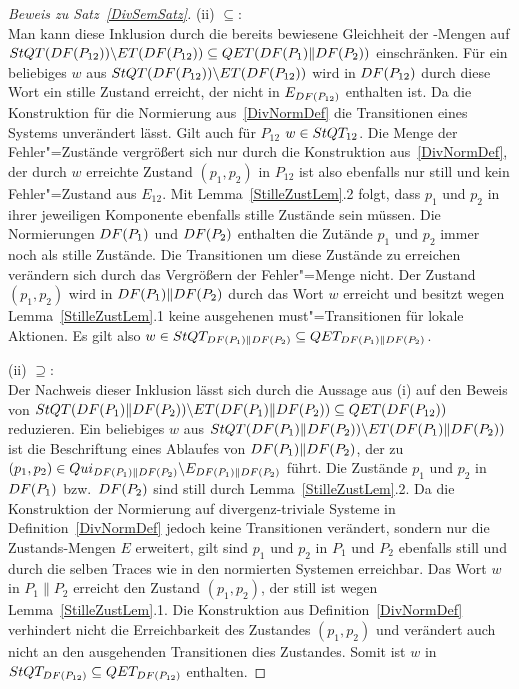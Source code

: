 \begin{proof}[Beweis zu Satz~\ref{DivSemSatz}]
  (ii) \glqq $\subseteq$\grqq:\\
  Man kann diese Inklusion durch die bereits bewiesene Gleichheit der
  \ET{}-Mengen auf $StQT (DF (P_{12})) \backslash ET (DF (P_{12}))
  \subseteq QET (DF (P_1)\|DF (P_2))$ einschränken. Für ein beliebiges $w$
  aus $StQT (DF (P_{12})) \backslash ET (DF (P_{12}))$ wird in $DF
  (P_{12})$ durch diese Wort ein stille Zustand erreicht, der nicht in $E_{DF
  (P_{12})}$ enthalten ist. Da die Konstruktion für die Normierung
  aus~\ref{DivNormDef} die Transitionen eines Systems unverändert lässt. Gilt
  auch für $P_{12}$ $w\in StQT _{12}$. Die Menge der Fehler"=Zustände
  vergrößert sich nur durch die Konstruktion aus~\ref{DivNormDef}, der durch
  $w$ erreichte Zustand $(p_1,p_2)$ in $P_{12}$ ist also ebenfalls nur still
  und kein Fehler"=Zustand aus $E_{12}$. Mit Lemma~\ref{StilleZustLem}.2 folgt,
  dass $p_1$ und $p_2$ in ihrer jeweiligen Komponente ebenfalls stille Zustände
  sein müssen. Die Normierungen $DF (P_1)$ und $DF (P_2)$ enthalten die
  Zutände $p_1$ und $p_2$ immer noch als stille Zustände. Die Transitionen um
  diese Zustände zu erreichen verändern sich durch das Vergrößern der
  Fehler"=Menge nicht. Der Zustand $(p_1,p_2)$ wird in $DF (P_1)\|DF (P_2)$
  durch das Wort $w$ erreicht und besitzt wegen Lemma~\ref{StilleZustLem}.1
  keine ausgehenen must"=Transitionen für lokale Aktionen. Es gilt also $w\in
  StQT _{DF (P_1)\|DF (P_2)}\subseteq QET _{DF (P_1)\|DF (P_2)}$.

  (ii) \glqq $\supseteq$\grqq:\\
  Der Nachweis dieser Inklusion lässt sich durch die Aussage aus (i) auf den
  Beweis von $StQT (DF (P_1)\|DF (P_2)) \backslash ET (DF (P_1)\|DF
  (P_2)) \subseteq QET (DF (P_{12}))$ reduzieren. Ein beliebiges $w$ aus
  $StQT (DF (P_1)\|DF (P_2)) \backslash ET (DF (P_1)\|DF (P_2))$ ist die
  Beschriftung eines Ablaufes von $DF (P_1)\|DF (P_2)$, der zu $(p_1,p_2)\in
  Qui _{DF (P_1)\|DF (P_2)}\backslash E_{DF (P_1)\|DF (P_2)}$ führt. Die
  Zustände $p_1$ und $p_2$ in $DF (P_1)$ bzw.\ $DF (P_2)$ sind still durch
  Lemma~\ref{StilleZustLem}.2. Da die Konstruktion der Normierung auf
  divergenz-triviale Systeme in Definition~\ref{DivNormDef} jedoch keine
  Transitionen verändert, sondern nur die Zustands-Mengen $E$ erweitert, gilt
  sind $p_1$ und $p_2$ in $P_1$ und $P_2$ ebenfalls still und durch die selben
  Traces wie in den normierten Systemen erreichbar. Das Wort $w$ in $P_1\|P_2$
  erreicht den Zustand $(p_1,p_2)$, der still ist wegen
  Lemma~\ref{StilleZustLem}.1. Die Konstruktion aus Definition~\ref{DivNormDef}
  verhindert nicht die Erreichbarkeit des Zustandes $(p_1,p_2)$ und verändert
  auch nicht an den ausgehenden Transitionen dies Zustandes. Somit ist $w$ in
  $StQT _{DF (P_{12})}\subseteq QET _{DF (P_{12})}$ enthalten.


\end{proof}
